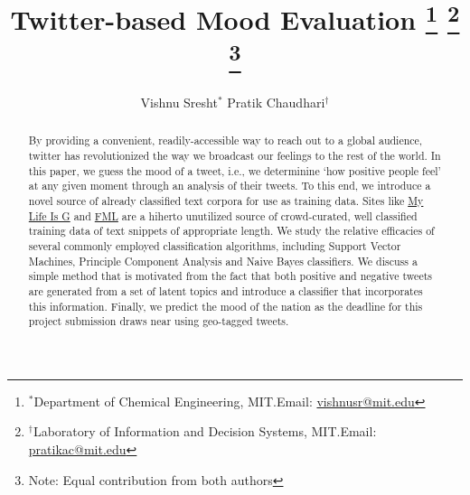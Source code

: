 \documentclass[11pt, letterpaper, conference, final, twocolumn]{ieeeconf}
\begin{document}
\title{\bf Twitter-based Mood Evaluation
	\thanks{$^*$Department of Chemical Engineering, MIT.\newline Email: \href{mailto:vishnusr@mit.edu}{vishnusr@mit.edu}}
	\thanks{$^\dag$Laboratory of Information and Decision Systems, MIT.\newline Email: \href{mailto:pratikac@mit.edu}{pratikac@mit.edu}}
	\thanks{Note: Equal contribution from both authors}
}
\author{Vishnu Sresht$^*$ \qquad Pratik Chaudhari$^\dag$}
\maketitle

\begin{abstract}
By providing a convenient, readily-accessible way to reach out to a global audience, twitter has revolutionized the way we broadcast our feelings to the rest of the world. In this paper, we guess the mood of a tweet, i.e., we determinine `how positive people feel' at any given moment through an analysis of their tweets. To this end, we introduce a novel source of already classified text corpora for use as training data. Sites like \href{http://mylifeisg.com}{My Life Is G} and \href{http://fmylife.com}{FML} are a hiherto unutilized source of crowd-curated, well classified training data of text snippets of appropriate length. We study the relative efficacies of several commonly employed classification algorithms, including Support Vector Machines, Principle Component Analysis and Naive Bayes classifiers. We discuss a simple method that is motivated from the fact that both positive and negative tweets are generated from a set of latent topics and introduce a classifier that incorporates this information. Finally, we predict the mood of the nation as the deadline for this project submission draws near using geo-tagged tweets.
\end{abstract}
\end{document}
